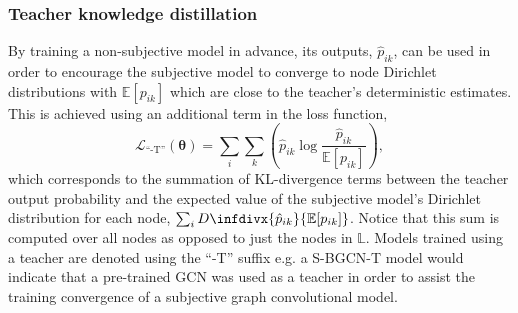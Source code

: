 \documentclass[
twocolumn,
]{ceurart}
\newcommand{\infdiv}{D\infdivx}
\begin{document}
\subsubsection{Teacher knowledge distillation}
By training a non-subjective model in advance, its outputs, $\hat{p}_{ik}$, can be used in order to encourage the subjective model to converge to node Dirichlet distributions with $\mathbb{E}[p_{ik}]$ which are close to the teacher's deterministic estimates.
This is achieved using an additional term in the loss function,
\begin{equation}
    \mathcal{L}_{\text{``-T''}}(\boldsymbol{\theta})=\sum_i\sum_k\left(\hat{p}_{ik}\log\frac{\hat{p}_{ik}}{\mathbb{E}[p_{ik}]}\right),
\end{equation}
which corresponds to the summation of KL-divergence terms between the teacher output probability and the expected value of the subjective model's Dirichlet distribution for each node, $\sum_i\infdiv{\hat{p}_{ik}}{\mathbb{E}[p_{ik}]}$.
Notice that this sum is computed over all nodes as opposed to just the nodes in $\mathbb{L}$.
Models trained using a teacher are denoted using the ``-T'' suffix e.g. a S-BGCN-T model would indicate that a pre-trained GCN was used as a teacher in order to assist the training convergence of a subjective graph convolutional model.
\end{document}
